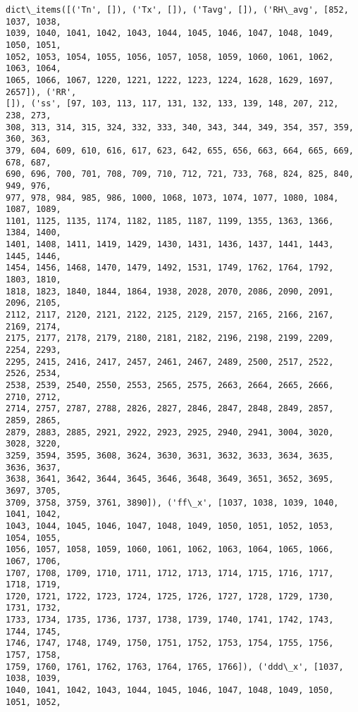 \documentclass[11pt]{article}
\makeatletter
\newcommand{\boxspacing}{\kern\kvtcb@left@rule\kern\kvtcb@boxsep}
\newcommand{\prompt}[4]{
        \ttfamily\llap{{\color{#2}[#3]:\hspace{3pt}#4}}\vspace{-\baselineskip}
    }
\makeatother
\begin{document}
            \begin{tcolorbox}[breakable, size=fbox, boxrule=.5pt, pad at break*=1mm, opacityfill=0]
\prompt{Out}{outcolor}{0}{\boxspacing}
\begin{Verbatim}[commandchars=\\\{\}]
dict\_items([('Tn', []), ('Tx', []), ('Tavg', []), ('RH\_avg', [852, 1037, 1038,
1039, 1040, 1041, 1042, 1043, 1044, 1045, 1046, 1047, 1048, 1049, 1050, 1051,
1052, 1053, 1054, 1055, 1056, 1057, 1058, 1059, 1060, 1061, 1062, 1063, 1064,
1065, 1066, 1067, 1220, 1221, 1222, 1223, 1224, 1628, 1629, 1697, 2657]), ('RR',
[]), ('ss', [97, 103, 113, 117, 131, 132, 133, 139, 148, 207, 212, 238, 273,
308, 313, 314, 315, 324, 332, 333, 340, 343, 344, 349, 354, 357, 359, 360, 363,
379, 604, 609, 610, 616, 617, 623, 642, 655, 656, 663, 664, 665, 669, 678, 687,
690, 696, 700, 701, 708, 709, 710, 712, 721, 733, 768, 824, 825, 840, 949, 976,
977, 978, 984, 985, 986, 1000, 1068, 1073, 1074, 1077, 1080, 1084, 1087, 1089,
1101, 1125, 1135, 1174, 1182, 1185, 1187, 1199, 1355, 1363, 1366, 1384, 1400,
1401, 1408, 1411, 1419, 1429, 1430, 1431, 1436, 1437, 1441, 1443, 1445, 1446,
1454, 1456, 1468, 1470, 1479, 1492, 1531, 1749, 1762, 1764, 1792, 1803, 1810,
1818, 1823, 1840, 1844, 1864, 1938, 2028, 2070, 2086, 2090, 2091, 2096, 2105,
2112, 2117, 2120, 2121, 2122, 2125, 2129, 2157, 2165, 2166, 2167, 2169, 2174,
2175, 2177, 2178, 2179, 2180, 2181, 2182, 2196, 2198, 2199, 2209, 2254, 2293,
2295, 2415, 2416, 2417, 2457, 2461, 2467, 2489, 2500, 2517, 2522, 2526, 2534,
2538, 2539, 2540, 2550, 2553, 2565, 2575, 2663, 2664, 2665, 2666, 2710, 2712,
2714, 2757, 2787, 2788, 2826, 2827, 2846, 2847, 2848, 2849, 2857, 2859, 2865,
2879, 2883, 2885, 2921, 2922, 2923, 2925, 2940, 2941, 3004, 3020, 3028, 3220,
3259, 3594, 3595, 3608, 3624, 3630, 3631, 3632, 3633, 3634, 3635, 3636, 3637,
3638, 3641, 3642, 3644, 3645, 3646, 3648, 3649, 3651, 3652, 3695, 3697, 3705,
3709, 3758, 3759, 3761, 3890]), ('ff\_x', [1037, 1038, 1039, 1040, 1041, 1042,
1043, 1044, 1045, 1046, 1047, 1048, 1049, 1050, 1051, 1052, 1053, 1054, 1055,
1056, 1057, 1058, 1059, 1060, 1061, 1062, 1063, 1064, 1065, 1066, 1067, 1706,
1707, 1708, 1709, 1710, 1711, 1712, 1713, 1714, 1715, 1716, 1717, 1718, 1719,
1720, 1721, 1722, 1723, 1724, 1725, 1726, 1727, 1728, 1729, 1730, 1731, 1732,
1733, 1734, 1735, 1736, 1737, 1738, 1739, 1740, 1741, 1742, 1743, 1744, 1745,
1746, 1747, 1748, 1749, 1750, 1751, 1752, 1753, 1754, 1755, 1756, 1757, 1758,
1759, 1760, 1761, 1762, 1763, 1764, 1765, 1766]), ('ddd\_x', [1037, 1038, 1039,
1040, 1041, 1042, 1043, 1044, 1045, 1046, 1047, 1048, 1049, 1050, 1051, 1052,

\end{Verbatim}
\end{tcolorbox}
\end{document}
